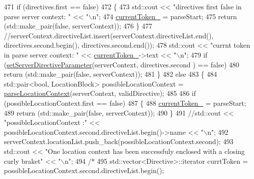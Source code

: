 \begin{DoxyCode}
471                 \textcolor{keywordflow}{if} (directives.first == \textcolor{keyword}{false})
472                 \{
473                     std::cout << \textcolor{stringliteral}{"directives first false in parse server context: "} << \textcolor{stringliteral}{"\(\backslash\)n"};
474                     \hyperlink{classft_1_1_parser_a942c5b794d108f144c5b5028aaa34cb6}{currentToken\_} = parseStart;
475                     \textcolor{keywordflow}{return} (std::make\_pair(\textcolor{keyword}{false}, serverContext));
476                 \}
477                 \textcolor{comment}{//serverContext.directiveList.insert(serverContext.directiveList.end(),
       directives.second.begin(), directives.second.end());}
478                 std::cout << \textcolor{stringliteral}{"currnt token in parse server context: "} << 
      \hyperlink{classft_1_1_parser_a942c5b794d108f144c5b5028aaa34cb6}{currentToken\_}->text << \textcolor{stringliteral}{"\(\backslash\)n"};
479                 \textcolor{keywordflow}{if} (\hyperlink{classft_1_1_parser_a18c1b12280ce1a16246a8ba09156116f}{setServerDirectiveParameter}(serverContext, directives.second
      ) == \textcolor{keyword}{false})
480                     \textcolor{keywordflow}{return} (std::make\_pair(\textcolor{keyword}{false}, serverContext));
481             \}
482             \textcolor{keywordflow}{else}
483             \{
484                 std::pair<bool, LocationBlock>  possibleLocationContext = 
      \hyperlink{classft_1_1_parser_a4eb83702cdd8772017f71dda995c4089}{parseLocationContext}(serverContext, validDirective);
485                         
486                 \textcolor{keywordflow}{if} (possibleLocationContext.first == \textcolor{keyword}{false})
487                 \{
488                     \hyperlink{classft_1_1_parser_a942c5b794d108f144c5b5028aaa34cb6}{currentToken\_} = parseStart;
489                     \textcolor{keywordflow}{return} (std::make\_pair(\textcolor{keyword}{false}, serverContext));
490                 \}
491                 \textcolor{comment}{//std::cout << "possibleLocationContext :" <<
       possibleLocationContext.second.directiveList.begin()->name << "\(\backslash\)n";}
492                 serverContext.locationList.push\_back(possibleLocationContext.second);
493                 std::cout << \textcolor{stringliteral}{"One location context has been successfuly enclosed with a closing curly
       braket"} << \textcolor{stringliteral}{"\(\backslash\)n"};
494 \textcolor{comment}{/*}
495 \textcolor{comment}{                std::vector<Directive>::iterator    currtToken =
       possibleLocationContext.second.directiveList.begin();}

\end{DoxyCode}
